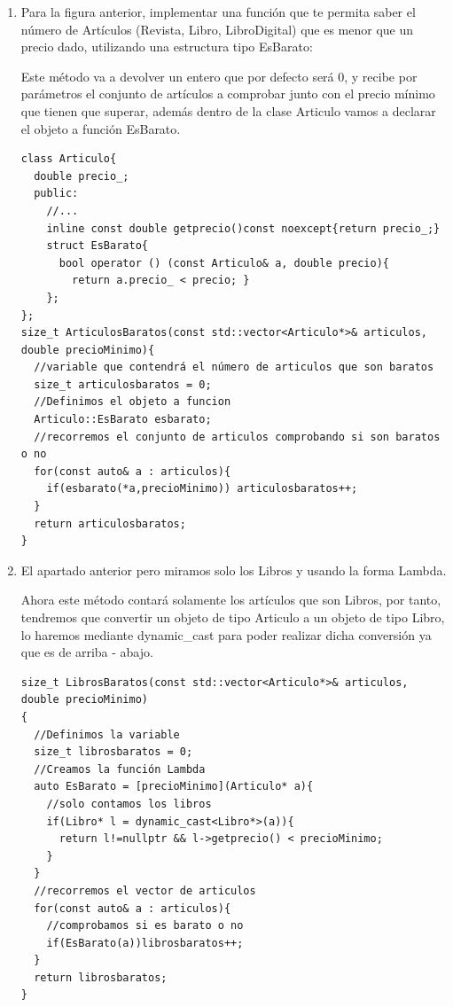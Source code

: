 \begin{enumerate}
  \item Para la figura anterior, implementar una función que te permita saber el número de Artículos (Revista, Libro, LibroDigital) que es menor que un precio dado, utilizando una estructura tipo EsBarato:

  Este método va a devolver un entero que por defecto será 0, y recibe por parámetros el conjunto de artículos a comprobar junto con el precio mínimo que tienen que superar, además dentro de la clase Articulo vamos a declarar el objeto a función EsBarato.

\begin{verbatim}
class Articulo{
  double precio_;
  public:
    //...
    inline const double getprecio()const noexcept{return precio_;}
    struct EsBarato{
      bool operator () (const Articulo& a, double precio){
        return a.precio_ < precio; }
    };
};
size_t ArticulosBaratos(const std::vector<Articulo*>& articulos, double precioMinimo){
  //variable que contendrá el número de articulos que son baratos
  size_t articulosbaratos = 0;
  //Definimos el objeto a funcion
  Articulo::EsBarato esbarato;
  //recorremos el conjunto de articulos comprobando si son baratos o no 
  for(const auto& a : articulos){
    if(esbarato(*a,precioMinimo)) articulosbaratos++;
  }
  return articulosbaratos;
}
\end{verbatim}
  \item El apartado anterior pero miramos solo los Libros y usando la forma Lambda.

  Ahora este método contará solamente los artículos que son Libros, por tanto, tendremos que convertir un objeto de tipo Articulo a un objeto de tipo Libro, lo haremos mediante dynamic\_cast para poder realizar dicha conversión ya que es de arriba - abajo.
\begin{verbatim}
size_t LibrosBaratos(const std::vector<Articulo*>& articulos, double precioMinimo)
{
  //Definimos la variable
  size_t librosbaratos = 0;
  //Creamos la función Lambda
  auto EsBarato = [precioMinimo](Articulo* a){
    //solo contamos los libros
    if(Libro* l = dynamic_cast<Libro*>(a)){
      return l!=nullptr && l->getprecio() < precioMinimo;
    }
  }
  //recorremos el vector de articulos
  for(const auto& a : articulos){
    //comprobamos si es barato o no
    if(EsBarato(a))librosbaratos++;
  }
  return librosbaratos;
}
\end{verbatim}


\end{enumerate}
